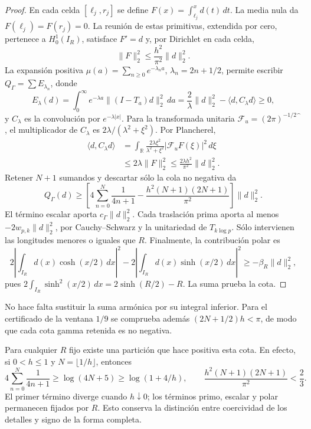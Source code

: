 \begin{proof}
En cada celda \([\ell_j,r_j]\) se define
\(F(x)=\int_{\ell_j}^x d(t)\,dt\). La media nula da
\(F(\ell_j)=F(r_j)=0\). La reunión de estas primitivas, extendida
por cero, pertenece a \(H_0^1(I_R)\), satisface \(F'=d\) y, por
Dirichlet en cada celda,
\begin{equation}
\|F\|_2^2\leq\frac{h^2}{\pi^2}\|d\|_2^2.
\label{viii:schur-add-primitiva}
\end{equation}
La expansión positiva
\(\mu(a)=\sum_{n\geq0}e^{-\lambda_n a}\), \(\lambda_n=2n+1/2\),
permite escribir \(Q_\Gamma=\sum E_{\lambda_n}\), donde
\begin{equation}
E_\lambda(d)=\int_0^\infty e^{-\lambda a}
 \|(I-T_a)d\|_2^2\,da
 =\frac2\lambda\|d\|_2^2-\langle d,C_\lambda d\rangle\geq0,
\label{viii:schur-add-energia-lambda}
\end{equation}
y \(C_\lambda\) es la convolución por \(e^{-\lambda|x|}\).
Para la transformada unitaria
\(\mathcal F_u=(2\pi)^{-1/2}\widehat{\phantom f}\), el multiplicador
de \(C_\lambda\) es \(2\lambda/(\lambda^2+\xi^2)\). Por Plancherel,
\begin{equation}
\begin{aligned}
\langle d,C_\lambda d\rangle
&=\int_{\mathbb R}\frac{2\lambda\xi^2}{\lambda^2+\xi^2}
 |\mathcal F_uF(\xi)|^2\,d\xi\\
&\leq2\lambda\|F\|_2^2
 \leq\frac{2\lambda h^2}{\pi^2}\|d\|_2^2 .
\end{aligned}
\label{viii:schur-add-cota-convolucion}
\end{equation}
Retener \(N+1\) sumandos y descartar sólo la cola no negativa da
\[
Q_\Gamma(d)\geq
\left[4\sum_{n=0}^N\frac1{4n+1}
-\frac{h^2(N+1)(2N+1)}{\pi^2}\right]\|d\|_2^2.
\]
El término escalar aporta \(c_\Gamma\|d\|_2^2\).
Cada traslación prima aporta al menos
\(-2w_{p,k}\|d\|_2^2\), por Cauchy--Schwarz y la unitariedad
de \(T_{k\log p}\). Sólo intervienen las longitudes menores o iguales
que \(R\).
Finalmente, la contribución polar es
\[
2\left|\int_{I_R}d(x)\cosh(x/2)\,dx\right|^2
-2\left|\int_{I_R}d(x)\sinh(x/2)\,dx\right|^2
\geq-\beta_R\|d\|_2^2,
\]
pues \(2\int_{I_R}\sinh^2(x/2)\,dx=2\sinh(R/2)-R\).
La suma prueba la cota.
\end{proof}
No hace falta sustituir la suma armónica por su integral inferior.
Para el certificado de la ventana \(1/9\) se comprueba además
\((2N+1/2)h<\pi\), de modo que cada cota gamma retenida es no negativa.

Para cualquier \(R\) fijo existe una partición que hace positiva esta
cota. En efecto, si \(0<h\leq1\) y \(N=\lfloor1/h\rfloor\), entonces
\[
4\sum_{n=0}^N\frac1{4n+1}\geq\log(4N+5)\geq\log(1+4/h),
\qquad
\frac{h^2(N+1)(2N+1)}{\pi^2}<\frac23.
\]
El primer término diverge cuando \(h\downarrow0\); los términos
primo, escalar y polar permanecen fijados por \(R\). Esto conserva
la distinción entre coercividad de los detalles y signo de la
forma completa.

